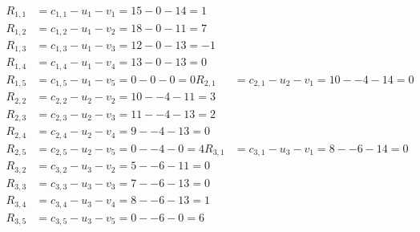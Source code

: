 \[
\begin{aligned}
R_{1,1} &= c_{1,1} - u_{1} - v_{1} = 15 - 0 - 14 = 1 \\
R_{1,2} &= c_{1,2} - u_{1} - v_{2} = 18 - 0 - 11 = 7 \\
R_{1,3} &= c_{1,3} - u_{1} - v_{3} = 12 - 0 - 13 = -1 \\
R_{1,4} &= c_{1,4} - u_{1} - v_{4} = 13 - 0 - 13 = 0 \\
R_{1,5} &= c_{1,5} - u_{1} - v_{5} = 0 - 0 - 0 = 0 
R_{2,1} &= c_{2,1} - u_{2} - v_{1} = 10 - -4 - 14 = 0 \\
R_{2,2} &= c_{2,2} - u_{2} - v_{2} = 10 - -4 - 11 = 3 \\
R_{2,3} &= c_{2,3} - u_{2} - v_{3} = 11 - -4 - 13 = 2 \\
R_{2,4} &= c_{2,4} - u_{2} - v_{4} = 9 - -4 - 13 = 0 \\
R_{2,5} &= c_{2,5} - u_{2} - v_{5} = 0 - -4 - 0 = 4 
R_{3,1} &= c_{3,1} - u_{3} - v_{1} = 8 - -6 - 14 = 0 \\
R_{3,2} &= c_{3,2} - u_{3} - v_{2} = 5 - -6 - 11 = 0 \\
R_{3,3} &= c_{3,3} - u_{3} - v_{3} = 7 - -6 - 13 = 0 \\
R_{3,4} &= c_{3,4} - u_{3} - v_{4} = 8 - -6 - 13 = 1 \\
R_{3,5} &= c_{3,5} - u_{3} - v_{5} = 0 - -6 - 0 = 6 
\end{aligned}
\]

